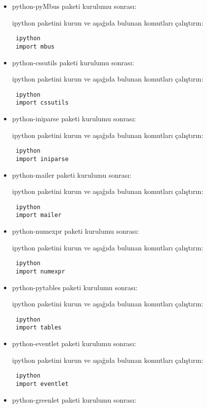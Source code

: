 \documentclass[a4paper,10pt]{article}
\begin{document}
\begin{itemize}
\item python-pyMbus paketi kurulumu sonrası:

ipython paketini kurun ve aşağıda bulunan komutları çalıştırın:
\begin{verbatim}
 ipython
 import mbus
\end{verbatim}

\item python-cssutils paketi kurulumu sonrası:

ipython paketini kurun ve aşağıda bulunan komutları çalıştırın:
\begin{verbatim}
 ipython
 import cssutils
\end{verbatim}

\item python-iniparse paketi kurulumu sonrası:

ipython paketini kurun ve aşağıda bulunan komutları çalıştırın:
\begin{verbatim}
 ipython
 import iniparse
\end{verbatim}

\item python-mailer paketi kurulumu sonrası:

ipython paketini kurun ve aşağıda bulunan komutları çalıştırın:
\begin{verbatim}
 ipython
 import mailer
\end{verbatim}

\item python-numexpr paketi kurulumu sonrası:

ipython paketini kurun ve aşağıda bulunan komutları çalıştırın:
\begin{verbatim}
 ipython
 import numexpr
\end{verbatim}

\item python-pytables paketi kurulumu sonrası:

ipython paketini kurun ve aşağıda bulunan komutları çalıştırın:
\begin{verbatim}
 ipython
 import tables
\end{verbatim}

\item python-eventlet paketi kurulumu sonrası:

ipython paketini kurun ve aşağıda bulunan komutları çalıştırın:
\begin{verbatim}
 ipython
 import eventlet
\end{verbatim}

\item python-greenlet paketi kurulumu sonrası:


\end{itemize}
\end{document}
